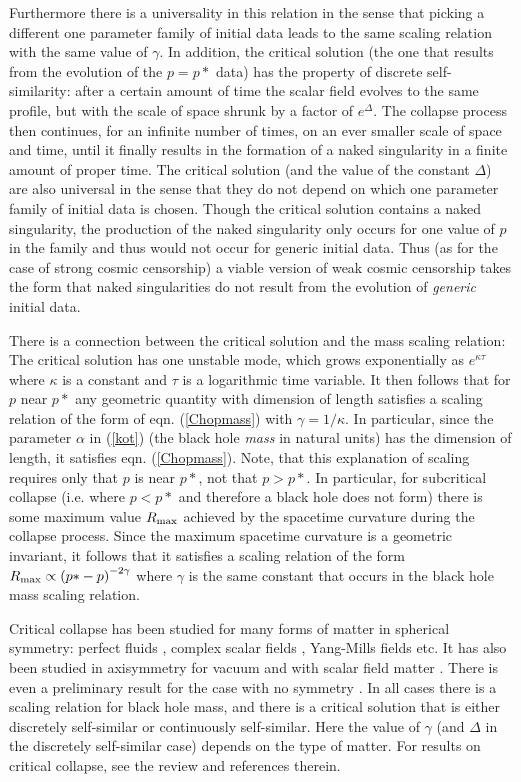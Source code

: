 \documentclass[12pt]{iopart}
\begin{document}
Furthermore there is a universality in this relation in the sense that picking a different one parameter family of initial data leads to the same scaling relation with the same value of $\gamma$.  In addition, the critical solution (the one that results from the evolution of the $p=p*$ data) has the property of discrete self-similarity: after a certain amount of time the scalar field evolves to the same profile, but with the scale of space shrunk by a factor of $e^\Delta$.  The collapse process then continues, for an infinite number of times, on an ever smaller scale of space and time, until it finally results in the formation of a naked singularity in a finite amount of proper time.  The critical solution (and the value of the constant $\Delta$) are also universal in the sense that they do not depend on which one parameter family of initial data is chosen.  Though the critical solution contains a naked singularity, the production of the naked singularity only occurs for one value of $p$ in the family and thus would not occur for generic initial data.  Thus (as for the case of strong cosmic censorship) a viable version of weak cosmic censorship takes the form that naked singularities do not result from the evolution of {\emph {generic}} initial data.   

There is a connection between the critical solution and the mass scaling relation: The critical solution has one unstable mode, which grows exponentially as $e^{\kappa \tau}$ where $\kappa $ is a constant and $\tau$ is a logarithmic time variable.  It then follows that for $p$ near $p*$ any geometric quantity with dimension of length satisfies a scaling relation of the form of eqn. (\ref{Chopmass}) with $\gamma =1/\kappa$.  In particular, since the parameter $\alpha$ in (\ref{kot}) (the black hole {\em mass} in natural units) has the dimension of length, it satisfies eqn. (\ref{Chopmass}).  Note, that this explanation of scaling requires only that $p$ is near $p*$, not that $p>p*$.  In particular, for subcritical collapse (i.e. where $p<p*$ and therefore a black hole does not form) there is some maximum value $R_{\rm max}$ achieved by the spacetime curvature during the collapse process.  Since the maximum spacetime curvature is a geometric invariant, it follows \cite{GarfDunc} that it satisfies a scaling relation of the form 
${R_{\rm max}} \propto {{({p*}-p)}^{-2\gamma}}$ where $\gamma$ is the same constant that occurs in the black hole mass scaling relation. 

Critical collapse has been studied for many forms of matter in spherical symmetry: perfect fluids \cite{Evans}, complex scalar fields \cite{Piran}, Yang-Mills fields \cite{ChopBizon} etc.  It has also been studied in axisymmetry for vacuum \cite{AE} and with scalar field matter \cite{UBCgroup}.
There is even a preliminary result for the case with no symmetry \cite{Laguna}. In all cases there is a scaling relation for black hole mass, and there is a critical solution that is either discretely self-similar or continuously self-similar.  Here the value of $\gamma$ (and $\Delta$ in the discretely self-similar case) depends on the type of matter.  For results on critical collapse, see the review \cite{Gundlach} and references therein.     
\end{document}
